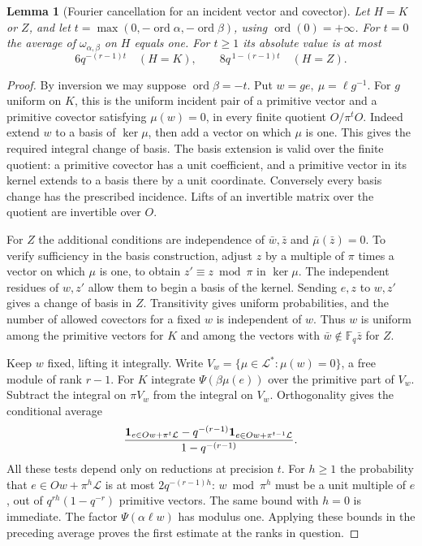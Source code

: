 \documentclass[a4paper,11pt]{article}
\newtheorem{lemma}[proposition]{Lemma}
\theoremstyle{definition}
\theoremstyle{remark}
\numberwithin{equation}{section}
\begin{document}
\begin{lemma}[Fourier cancellation for an incident vector and covector]
\leavevmode\label{lem:flagwave890}
Let \(H=K\) or \(Z\), and let
\(t=\max(0,-\operatorname{ord}\alpha,-\operatorname{ord}\beta)\),
using \(\operatorname{ord}(0)=+\infty\). For \(t=0\) the average
of \(\omega_{\alpha,\beta}\) on \(H\) equals one. For \(t\ge1\)
its absolute value is at most
\begin{equation}
 6q^{-(r-1)t}\quad(H=K),\qquad
 8q^{\,1-(r-1)t}\quad(H=Z).
 \label{eq:flagwave890}
\end{equation}
\end{lemma}
\begin{proof}
By inversion we may suppose \(\operatorname{ord}\beta=-t\).
Put \(w=g e,\ \mu=\ell g^{-1}\). For \(g\) uniform on \(K\),
this is the uniform incident pair of a primitive vector and a
primitive covector satisfying \(\mu(w)=0\), in every finite
quotient \(O/\pi^tO\). Indeed extend \(w\) to a basis of
\(\ker\mu\), then add a vector on which \(\mu\) is one. This
gives the required integral change of basis. The basis extension
is valid over the finite quotient: a primitive covector has a
unit coefficient, and a primitive vector in its kernel extends
to a basis there by a unit coordinate. Conversely every basis
change has the prescribed incidence. Lifts of an invertible
matrix over the quotient are invertible over \(O\).

For \(Z\) the additional conditions are independence of
\(\bar w,\bar z\) and \(\bar\mu(\bar z)=0\). To verify
sufficiency in the basis construction, adjust \(z\) by a
multiple of \(\pi\) times a vector on which \(\mu\) is one, to
obtain \(z'\equiv z\bmod\pi\) in \(\ker\mu\). The independent
residues of \(w,z'\) allow them to begin a basis of the kernel.
Sending \(e,z\) to \(w,z'\) gives a change of basis in \(Z\).
Transitivity gives uniform probabilities, and the number of
allowed covectors for a fixed \(w\) is independent of \(w\).
Thus \(w\) is uniform among the primitive vectors for \(K\)
and among the vectors with \(\bar w\notin\mathbb F_q\bar z\)
for \(Z\).

Keep \(w\) fixed, lifting it integrally. Write
\(V_w=\{\mu\in\mathcal L^*:\mu(w)=0\}\), a free module of rank
\(r-1\). For \(K\) integrate \(\Psi(\beta\mu(e))\) over the
primitive part of \(V_w\). Subtract the integral on \(\pi V_w\)
from the integral on \(V_w\). Orthogonality gives the conditional
average
\[
 \frac{{\bf1}_{e\in O w+\pi^t\mathcal L}
       -q^{-(r-1)}{\bf1}_{e\in O w+\pi^{t-1}\mathcal L}}
      {1-q^{-(r-1)}}.
\]
All these tests depend only on reductions at precision \(t\).
For \(h\ge1\) the probability that \(e\in O w+\pi^h\mathcal L\)
is at most \(2q^{-(r-1)h}\): \(w\bmod\pi^h\) must be a unit
multiple of \(e\), out of \(q^{rh}(1-q^{-r})\) primitive vectors.
The same bound with \(h=0\) is immediate. The factor
\(\Psi(\alpha\ell w)\) has modulus one. Applying these bounds
in the preceding average proves the first estimate at the
ranks in question.


\end{proof}
\end{document}
